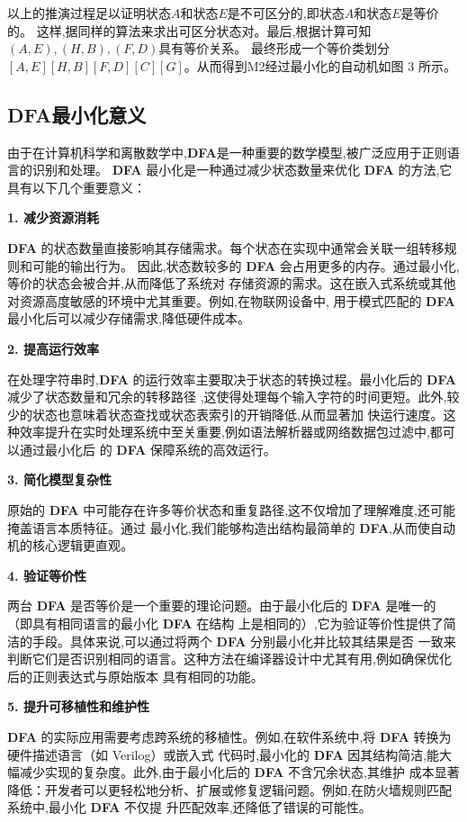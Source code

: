 \documentclass[UTF8]{ctexart}
\begin{document}
	以上的推演过程足以证明状态$A$和状态$E$是不可区分的,即状态$A$和状态$E$是等价的。
	这样,据同样的算法来求出可区分状态对。最后,根据计算可知$(A,E),(H,B),(F,D)$具有等价关系。
	最终形成一个等价类划分$[A,E][H,B][F,D][C][G]$。从而得到M2经过最小化的自动机如图 3 所示。
	
	
	
	\subsection{DFA最小化意义}
	
	由于在计算机科学和离散数学中,\textbf{DFA}是一种重要的数学模型,被广泛应用于正则语言的识别和处理。
	\textbf{DFA} 最小化是一种通过减少状态数量来优化 \textbf{DFA} 的方法,它具有以下几个重要意义： 
	
	\textbf{1. 减少资源消耗}
	
	\textbf{DFA} 的状态数量直接影响其存储需求。每个状态在实现中通常会关联一组转移规则和可能的输出行为。
	因此,状态数较多的 \textbf{DFA} 会占用更多的内存。通过最小化,等价的状态会被合并,从而降低了系统对
	存储资源的需求。这在嵌入式系统或其他对资源高度敏感的环境中尤其重要。例如,在物联网设备中,
	用于模式匹配的 \textbf{DFA} 最小化后可以减少存储需求,降低硬件成本。
	
	\textbf{2. 提高运行效率}
	
	在处理字符串时,\textbf{DFA} 的运行效率主要取决于状态的转换过程。最小化后的 \textbf{DFA} 减少了状态数量和冗余的转移路径
	,这使得处理每个输入字符的时间更短。此外,较少的状态也意味着状态查找或状态表索引的开销降低,从而显著加
	快运行速度。这种效率提升在实时处理系统中至关重要,例如语法解析器或网络数据包过滤中,都可以通过最小化后
	的 \textbf{DFA} 保障系统的高效运行。
	
	\textbf{3. 简化模型复杂性}
	
	原始的 \textbf{DFA} 中可能存在许多等价状态和重复路径,这不仅增加了理解难度,还可能掩盖语言本质特征。通过
	最小化,我们能够构造出结构最简单的 \textbf{DFA},从而使自动机的核心逻辑更直观。
	
	\textbf{4. 验证等价性}
	
	两台 \textbf{DFA} 是否等价是一个重要的理论问题。由于最小化后的 \textbf{DFA} 是唯一的（即具有相同语言的最小化 \textbf{DFA} 在结构
	上是相同的）,它为验证等价性提供了简洁的手段。具体来说,可以通过将两个 \textbf{DFA} 分别最小化并比较其结果是否
	一致来判断它们是否识别相同的语言。这种方法在编译器设计中尤其有用,例如确保优化后的正则表达式与原始版本
	具有相同的功能。
	
	\textbf{5. 提升可移植性和维护性}
	
	\textbf{DFA} 的实际应用需要考虑跨系统的移植性。例如,在软件系统中,将 \textbf{DFA} 转换为硬件描述语言（如 Verilog）或嵌入式
	代码时,最小化的 \textbf{DFA} 因其结构简洁,能大幅减少实现的复杂度。此外,由于最小化后的 \textbf{DFA} 不含冗余状态,其维护
	成本显著降低：开发者可以更轻松地分析、扩展或修复逻辑问题。例如,在防火墙规则匹配系统中,最小化 \textbf{DFA} 不仅提
	升匹配效率,还降低了错误的可能性。
	
\end{document}
